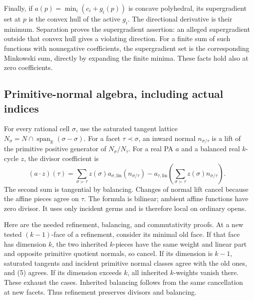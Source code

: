 \documentclass[
  11pt,
]{article}
\begin{document}
Finally, if \(a(p)=\min_i(c_i+g_i(p))\) is concave polyhedral, its
supergradient set at \(p\) is the convex hull of the active \(g_i\). The
directional derivative is their minimum. Separation proves the
supergradient assertion: an alleged supergradient outside that convex
hull gives a violating direction. For a finite sum of such functions
with nonnegative coefficients, the supergradient set is the
corresponding Minkowski sum, directly by expanding the finite minima.
These facts hold also at zero coefficients.

\subsection{Primitive-normal algebra, including actual
indices}\label{primitive-normal-algebra-including-actual-indices}

For every rational cell \(\sigma\), use the saturated tangent lattice
\(N_\sigma=N\cap\operatorname{span}_{\mathbb{R}}(\sigma-\sigma)\). For a
facet \(\tau\prec\sigma\), an inward normal \(n_{\sigma/\tau}\) is a
lift of the primitive positive generator of \(N_\sigma/N_\tau\). For a
real PA \(a\) and a balanced real \(k\)-cycle \(z\), the divisor
coefficient is \[
 (a\cdot z)(\tau)=\sum_{\sigma\succ\tau}z(\sigma)a_{\sigma,\mathrm{lin}}(n_{\sigma/\tau})
 -a_{\tau,\mathrm{lin}}\left(\sum_{\sigma\succ\tau}z(\sigma)n_{\sigma/\tau}\right).       \tag{5}
\] The second sum is tangential by balancing. Changes of normal lift
cancel because the affine pieces agree on \(\tau\). The formula is
bilinear; ambient affine functions have zero divisor. It uses only
incident germs and is therefore local on ordinary opens.

Here are the needed refinement, balancing, and commutativity proofs. At
a new tested \((k-1)\)-face of a refinement, consider its minimal old
face. If that face has dimension \(k\), the two inherited \(k\)-pieces
have the same weight and linear part and opposite primitive quotient
normals, so cancel. If its dimension is \(k-1\), saturated tangents and
incident primitive normal classes agree with the old ones, and (5)
agrees. If its dimension exceeds \(k\), all inherited \(k\)-weights
vanish there. These exhaust the cases. Inherited balancing follows from
the same cancellation at new facets. Thus refinement preserves divisors
and balancing.
\end{document}
